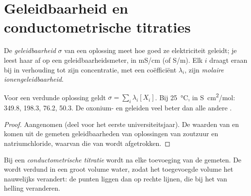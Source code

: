 \section{Geleidbaarheid en conductometrische titraties}

\begin{definition}\label{def:g12:ph-conductivity-titrations:conductivity}
De \emph{geleidbaarheid} $\sigma$ van een oplossing
meet hoe goed ze elektriciteit geleidt; je leest haar af op een
geleidbaarheidsmeter, in \si{mS/cm} (of \si{S/m}). Elk  $i$ draagt eraan
bij in verhouding tot zijn concentratie, met een coëfficiënt $\lambda_i$,
zijn \emph{molaire ionengeleidbaarheid}.
\end{definition}

\begin{proposition}\label{prop:g12:ph-conductivity-titrations:kohlrausch}
Voor een verdunde oplossing geldt $\sigma = \sum_i \lambda_i [X_i]$. Bij
\qty{25}{\celsius}, in \si{S.cm^2/mol}:  349.8,  198.3,
 76.2,  50.3. De oxonium- en  geleiden veel
beter dan alle andere .
\end{proposition}

\begin{proof}
Aangenomen (deel voor het eerste universiteitsjaar). De waarden van
 en  komen uit de gemeten geleidbaarheden van oplossingen
van zoutzuur en natriumchloride, waarvan die van  wordt
afgetrokken.
\end{proof}

\begin{definition}\label{def:g12:ph-conductivity-titrations:conductimetric}
Bij een \emph{conductometrische titratie}
wordt na elke toevoeging van  de  gemeten.
De  wordt verdund in een groot volume water, zodat
het toegevoegde volume het nauwelijks verandert: de punten liggen dan op
rechte lijnen, die bij het  van helling veranderen.
\end{definition}

